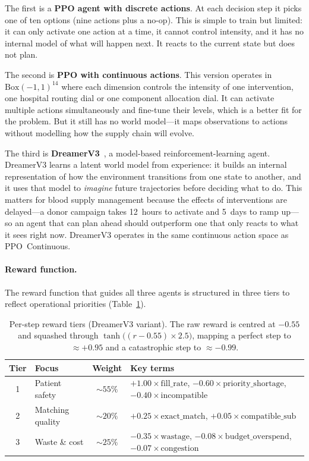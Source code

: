 The first is a \textbf{PPO agent with discrete actions}.  At each decision
step it picks one of ten options (nine actions plus a no-op).  This is
simple to train but limited: it can only activate one action at a time,
it cannot control intensity, and it has no internal model of what will
happen next.  It reacts to the current state but does not plan.

The second is \textbf{PPO with continuous actions}.  This version operates
in $\text{Box}(-1,1)^{14}$ where each dimension controls the intensity of
one intervention, one hospital routing dial or one component allocation
dial.  It can activate multiple actions simultaneously and fine-tune their
levels, which is a better fit for the problem.  But it still has no world
model---it maps observations to actions without modelling how the supply
chain will evolve.

The third is \textbf{DreamerV3}~\cite{hafner2023dreamerv3}, a model-based
reinforcement-learning agent.  DreamerV3 learns a latent world model from
experience: it builds an internal representation of how the environment
transitions from one state to another, and it uses that model to
\emph{imagine} future trajectories before deciding what to do.  This matters
for blood supply management because the effects of interventions are
delayed---a donor campaign takes 12~hours to activate and 5~days to ramp
up---so an agent that can plan ahead should outperform one that only reacts
to what it sees right now.  DreamerV3 operates in the same continuous action
space as PPO~Continuous.

\paragraph{Reward function.}

The reward function that guides all three agents is structured in three
tiers to reflect operational priorities
(Table~\ref{tab:reward-tiers}).

\begin{table}[htbp]
\centering
\caption{Per-step reward tiers (DreamerV3 variant).  The raw reward is
         centred at $-0.55$ and squashed through
         $\tanh\!\bigl((r-0.55)\times2.5\bigr)$, mapping a perfect step
         to ${\approx}+0.95$ and a catastrophic step to
         ${\approx}-0.99$.}
\label{tab:reward-tiers}
\small
\begin{tabular}{@{}clcl@{}}
\toprule
\textbf{Tier} & \textbf{Focus} & \textbf{Weight} & \textbf{Key terms} \\
\midrule
1 & Patient safety      & ${\sim}55\%$
  & $+1.00\times\text{fill\_rate}$, \;
    $-0.60\times\text{priority\_shortage}$, \;
    $-0.40\times\text{incompatible}$ \\
2 & Matching quality    & ${\sim}20\%$
  & $+0.25\times\text{exact\_match}$, \;
    $+0.05\times\text{compatible\_sub}$ \\
3 & Waste \& cost       & ${\sim}25\%$
  & $-0.35\times\text{wastage}$, \;
    $-0.08\times\text{budget\_overspend}$, \;
    $-0.07\times\text{congestion}$ \\
\bottomrule
\end{tabular}
\end{table}

